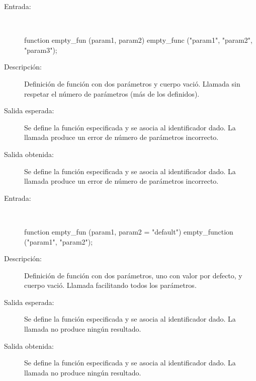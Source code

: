 	\begin{description}
		\item [Entrada:] \hfill \\
\begin{myverbatim}
   function empty_fun (param1, param2) { } 
   empty_func ("param1", "param2", "param3");
\end{myverbatim}
		\item [Descripción:] Definición de función con dos parámetros y cuerpo vació. Llamada sin respetar el número de parámetros (más de los definidos). 
		\item [Salida esperada:] Se define la función especificada y se asocia al identificador dado. La llamada produce un error de número de parámetros incorrecto. 
		\item [Salida obtenida:] Se define la función especificada y se asocia al identificador dado. La llamada produce un error de número de parámetros incorrecto.
	\end{description}

	\begin{description}
		\item [Entrada:] \hfill \\
\begin{myverbatim}
   function empty_fun (param1, param2 = "default") { } 
   empty_function ("param1", "param2");
\end{myverbatim}
		\item [Descripción:] Definición de función con dos parámetros, uno con valor por defecto, y cuerpo vació. Llamada facilitando todos los parámetros.
		\item [Salida esperada:] Se define la función especificada y se asocia al identificador dado. La llamada no produce ningún resultado.
		\item [Salida obtenida:] Se define la función especificada y se asocia al identificador dado. La llamada no produce ningún resultado.
	\end{description}

